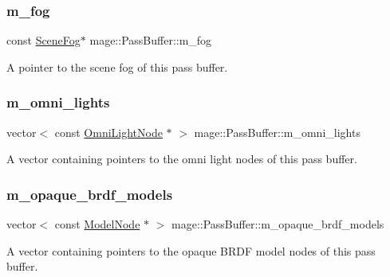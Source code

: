 \subsubsection{\texorpdfstring{m\+\_\+fog}{m\_fog}}
{\footnotesize\ttfamily const \hyperlink{classmage_1_1_scene_fog}{Scene\+Fog}$\ast$ mage\+::\+Pass\+Buffer\+::m\+\_\+fog\hspace{0.3cm}{\ttfamily [private]}}

A pointer to the scene fog of this pass buffer. \hypertarget{structmage_1_1_pass_buffer_ab4553bc8afe80eff1f52d511cd23e90b}{}\label{structmage_1_1_pass_buffer_ab4553bc8afe80eff1f52d511cd23e90b} 
\subsubsection{\texorpdfstring{m\+\_\+omni\+\_\+lights}{m\_omni\_lights}}
{\footnotesize\ttfamily vector$<$ const \hyperlink{namespacemage_a1724c6e6b6b5ba535cdd967cbbb4a669}{Omni\+Light\+Node} $\ast$ $>$ mage\+::\+Pass\+Buffer\+::m\+\_\+omni\+\_\+lights\hspace{0.3cm}{\ttfamily [private]}}

A vector containing pointers to the omni light nodes of this pass buffer. \hypertarget{structmage_1_1_pass_buffer_a7b866f3637755bfb2d951fe8a3495bea}{}\label{structmage_1_1_pass_buffer_a7b866f3637755bfb2d951fe8a3495bea} 
\subsubsection{\texorpdfstring{m\+\_\+opaque\+\_\+brdf\+\_\+models}{m\_opaque\_brdf\_models}}
{\footnotesize\ttfamily vector$<$ const \hyperlink{classmage_1_1_model_node}{Model\+Node} $\ast$ $>$ mage\+::\+Pass\+Buffer\+::m\+\_\+opaque\+\_\+brdf\+\_\+models\hspace{0.3cm}{\ttfamily [private]}}

A vector containing pointers to the opaque B\+R\+DF model nodes of this pass buffer. \hypertarget{structmage_1_1_pass_buffer_a6a2c8f757aca5b28eda0bec25f412e05}{}\label{structmage_1_1_pass_buffer_a6a2c8f757aca5b28eda0bec25f412e05} 
